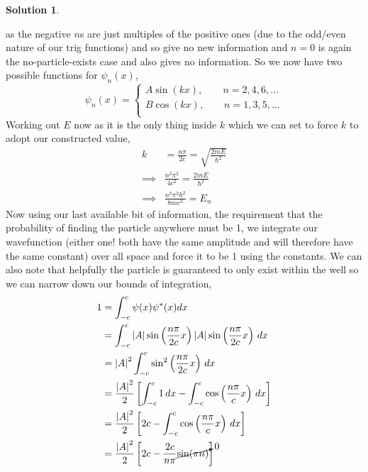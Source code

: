 \documentclass[10pt]{article}
\theoremstyle{definition}
\newtheorem{soln}{Solution}
\begin{document}
\begin{soln}
\begin{enumerate}[label=(\alph*)]
          as the negative $n$s are just multiples of the positive ones (due to the odd/even nature of our trig functions) and so give no new information and $n=0$ is again the no-particle-exists case
          and also gives no information. So we now have two possible functions for $\psi_n(x)$,
          $$
            \psi_n(x) =
            \begin{cases}
              A\sin(kx),\qquad n=2,4,6,\dots \\
              B\cos(kx),\qquad n=1,3,5,\dots \\
            \end{cases}
          $$
          Working out $E$ now as it is the only thing inside $k$ which we can set to force $k$ to adopt our constructed value,
          \begin{align*}
            k        & =\frac{n\pi}{2c}=\sqrt{\frac{2mE}{\hbar^2}} \\
            \implies & \frac{n^2\pi^2}{4c^2}=\frac{2mE}{\hbar^2}   \\
            \implies & \frac{n^2\pi^2\hbar^2}{8mc^2}=E_n
          \end{align*}
          Now using our last available bit of information, the requirement that the probability of finding the particle anywhere must be 1,
          we integrate our wavefunction (either one! both have the same amplitude and will therefore have the same constant) over all space and force it to be 1 using the constants.
          We can also note that helpfully the particle is guaranteed to only exist within the well so we can narrow down our bounds of integration,
          \begin{align*}
            1 & =\int_{-c}^{c}\psi(x)\psi^*(x)dx                                                                                 \\
              & =\int_{-c}^{c}\left|A\right|\sin\left(\frac{n\pi}{2c}x\right)\left|A\right|\sin\left(\frac{n\pi}{2c}x\right)\,dx \\
              & =\left|A\right|^2\int_{-c}^{c}\sin^2\left(\frac{n\pi}{2c}x\right)\,dx                                            \\
              & =\frac{\left|A\right|^2}{2}\left[\int_{-c}^{c}1\,dx-\int_{-c}^{c}\cos\left(\frac{n\pi}{c}x\right)\,dx\right]     \\
              & =\frac{\left|A\right|^2}{2}\left[2c-\int_{-c}^{c}\cos\left(\frac{n\pi}{c}x\right)\,dx\right]                     \\
              & =\frac{\left|A\right|^2}{2}\left[2c-\frac{2c}{n\pi}\cancelto{0}{\sin(\pi n)}\right]

\end{align*}
\end{enumerate}
\end{soln}
\end{document}
